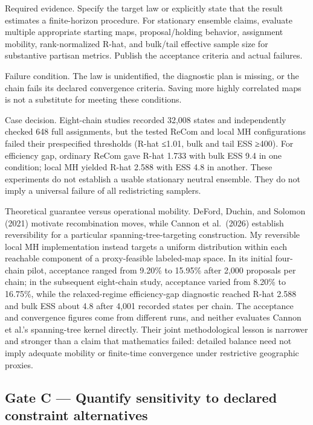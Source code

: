 \documentclass[
  10pt,
]{article}
\begin{document}
Required evidence. Specify the target law or explicitly state that the
result estimates a finite-horizon procedure. For stationary ensemble
claims, evaluate multiple appropriate starting maps, proposal/holding
behavior, assignment mobility, rank-normalized R-hat, and bulk/tail
effective sample size for substantive partisan metrics. Publish the
acceptance criteria and actual failures.

Failure condition. The law is unidentified, the diagnostic plan is
missing, or the chain fails its declared convergence criteria. Saving
more highly correlated maps is not a substitute for meeting these
conditions.

Case decision. Eight-chain studies recorded 32,008 states and
independently checked 648 full assignments, but the tested ReCom and
local MH configurations failed their prespecified thresholds (R-hat
≤1.01, bulk and tail ESS ≥400). For efficiency gap, ordinary ReCom gave
R-hat 1.733 with bulk ESS 9.4 in one condition; local MH yielded R-hat
2.588 with ESS 4.8 in another. These experiments do not establish a
usable stationary neutral ensemble. They do not imply a universal
failure of all redistricting samplers.

Theoretical guarantee versus operational mobility. DeFord, Duchin, and
Solomon (2021) motivate recombination moves, while Cannon et al.~(2026)
establish reversibility for a particular spanning-tree-targeting
construction. My reversible local MH implementation instead targets a
uniform distribution within each reachable component of a proxy-feasible
labeled-map space. In its initial four-chain pilot, acceptance ranged
from 9.20\% to 15.95\% after 2,000 proposals per chain; in the
subsequent eight-chain study, acceptance varied from 8.20\% to 16.75\%,
while the relaxed-regime efficiency-gap diagnostic reached R-hat 2.588
and bulk ESS about 4.8 after 4,001 recorded states per chain. The
acceptance and convergence figures come from different runs, and neither
evaluates Cannon et al.'s spanning-tree kernel directly. Their joint
methodological lesson is narrower and stronger than a claim that
mathematics failed: detailed balance need not imply adequate mobility or
finite-time convergence under restrictive geographic proxies.

\hypertarget{gate-c-quantify-sensitivity-to-declared-constraint-alternatives}{%
\subsection{Gate C --- Quantify sensitivity to declared constraint
alternatives}\label{gate-c-quantify-sensitivity-to-declared-constraint-alternatives}}
\end{document}
